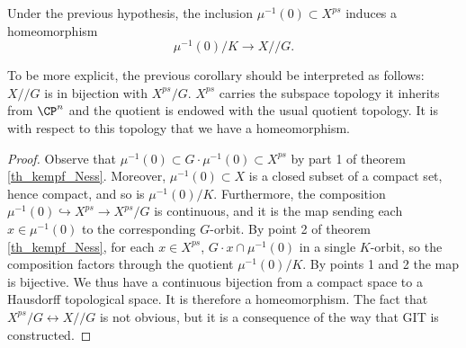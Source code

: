 \begin{corollary}
    Under the previous hypothesis, the inclusion $\mu^{-1}(0) \subset X^{ps}$ induces a homeomorphism
    \[
    \mu^{-1}(0)/K \to X /\!\!/ G.
    \]
\end{corollary}
To be more explicit, the previous corollary should be interpreted as follows: \(X /\!\!/ G\) is in bijection with \(X^{ps}/G\). \(X^{ps}\) carries the subspace topology it inherits from \(\CP^n\) and the quotient is endowed with the usual quotient topology. It is with respect to this topology that we have a homeomorphism.
\begin{proof}
    Observe that \(\mu^{-1}(0) \subset G\cdot \mu^{-1}(0)\subset X^{ps}\) by part 1 of theorem \ref{th_kempf_Ness}. Moreover, \(\mu^{-1}(0)\subset X\) is a closed subset of a compact set, hence compact, and so is \(\mu^{-1}(0)/K\). Furthermore, the composition \(\mu^{-1}(0) \hookrightarrow X^{ps} \to X^{ps}/G\) is continuous, and it is the map sending each \(x\in \mu^{-1}(0)\) to the corresponding \(G\)-orbit. By point 2 of theorem \ref{th_kempf_Ness}, for each \(x\in X^{ps}\), \(G\cdot x \cap \mu^{-1}(0)\) in a single \(K\)-orbit, so the composition factors through the quotient \(\mu^{-1}(0)/K\). By points 1 and 2 the map is bijective. We thus have a continuous bijection from a compact space to a Hausdorff topological space. It is therefore a homeomorphism. The fact that \(X^{ps}/G \leftrightarrow X /\!\!/ G\) is not obvious, but it is a consequence of the way that GIT is constructed. 
\end{proof}



